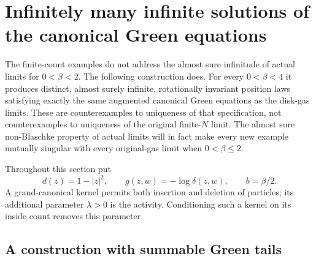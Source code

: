 \documentclass[11pt,a4paper]{article}
\numberwithin{equation}{section}
\theoremstyle{definition}
\theoremstyle{remark}
\begin{document}
\section{Infinitely many infinite solutions of the canonical Green equations}
\label{sec:infinite-green-gibbs-nonuniqueness}

The finite-count examples do not address the almost sure infinitude of
actual limits for $0<\beta<2$.  The following construction
does.  For every $0<\beta<4$ it produces distinct, almost surely infinite,
rotationally invariant position laws satisfying exactly the same augmented
canonical Green equations as the disk-gas limits.  These are counterexamples
to uniqueness of that specification, not counterexamples to uniqueness of
the original finite-$N$ limit.  The almost sure non-Blaschke property of actual limits will in fact make
every new example mutually singular with every original-gas limit when
$0<\beta\le2$.

Throughout this section put
\[
 d(z)=1-|z|^2,\qquad
 g(z,w)=-\log\delta(z,w),\qquad b=\beta/2.
\]
A grand-canonical kernel permits both insertion and deletion of particles;
its additional parameter $\lambda>0$ is the activity.  Conditioning such a
kernel on its inside count removes this parameter.

\subsection{A construction with summable Green tails}
\end{document}
